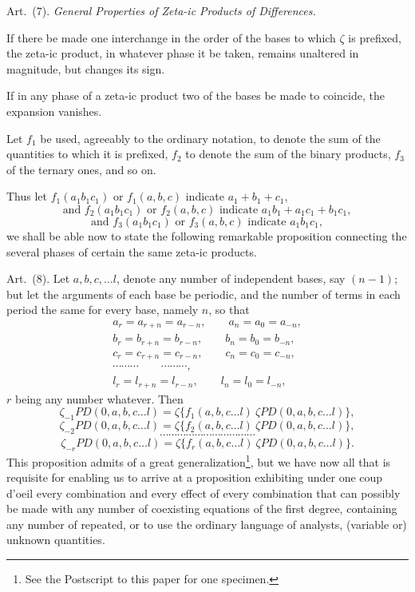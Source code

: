 \documentclass[11pt]{article}
\newcommand{\sourcepage}[1]{\marginpar{\scriptsize p.~#1}}
\newcommand{\art}[1]{\par\smallskip\noindent Art.~(#1).\quad}
\newcommand{\PD}{\mathit{PD}}
\begin{document}
\sourcepage{49}
\art{7} \emph{General Properties of Zeta-ic Products of Differences.}

If there be made one interchange in the order of the bases to which $\zeta$ is prefixed, the zeta-ic product, in whatever phase it be taken, remains unaltered in magnitude, but changes its sign.

If in any phase of a zeta-ic product two of the bases be made to coincide, the expansion vanishes.

Let $f_1$ be used, agreeably to the ordinary notation, to denote the sum of the quantities to which it is prefixed, $f_2$ to denote the sum of the binary products, $f_3$ of the ternary ones, and so on.

Thus let $f_1(a_1b_1c_1)$ or $f_1(a,b,c)$ indicate $a_1+b_1+c_1$,
\[
 \text{and }f_2(a_1b_1c_1)\text{ or }f_2(a,b,c)\text{ indicate }a_1b_1+a_1c_1+b_1c_1,
\]
\[
 \text{and }f_3(a_1b_1c_1)\text{ or }f_3(a,b,c)\text{ indicate }a_1b_1c_1,
\]
we shall be able now to state the following remarkable proposition connecting the several phases of certain the same zeta-ic products.

\art{8} Let $a,b,c,\ldots l$, denote any number of independent bases, say $(n-1)$; but let the arguments of each base be periodic, and the number of terms in each period the same for every base, namely $n$, so that
\[
\begin{gathered}
 a_r=a_{r+n}=a_{r-n},\qquad a_n=a_0=a_{-n},\\
 b_r=b_{r+n}=b_{r-n},\qquad b_n=b_0=b_{-n},\\
 c_r=c_{r+n}=c_{r-n},\qquad c_n=c_0=c_{-n},\\
 \cdots\cdots\cdots\qquad\cdots\cdots\cdots,\\
 l_r=l_{r+n}=l_{r-n},\qquad l_n=l_0=l_{-n},
\end{gathered}
\]
$r$ being any number whatever. Then
\[
 \zeta_{-1}\PD(0,a,b,c\ldots l)=\zeta\{f_1(a,b,c\ldots l)\ \zeta\PD(0,a,b,c\ldots l)\},
\]
\[
 \zeta_{-2}\PD(0,a,b,c\ldots l)=\zeta\{f_2(a,b,c\ldots l)\ \zeta\PD(0,a,b,c\ldots l)\},
\]
\[
 \cdots\cdots\cdots\cdots\cdots\cdots\cdots\cdots\cdots\cdots\cdots
\]
\[
 \zeta_{-r}\PD(0,a,b,c\ldots l)=\zeta\{f_r(a,b,c\ldots l)\ \zeta\PD(0,a,b,c\ldots l)\}.
\]
This proposition admits of a great generalization\footnote{See the Postscript to this paper for one specimen.}, but we have now all that is requisite for enabling us to arrive at a proposition exhibiting under one coup d'oeil every combination and every effect of every combination that can possibly be made with any number of coexisting equations of the first degree, containing any number of repeated, or to use the ordinary language of analysts, (variable or) unknown quantities.
\end{document}
